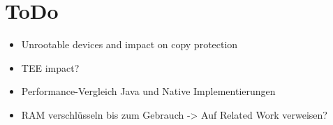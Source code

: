 \chapter{ToDo}

\begin{itemize}
\item Unrootable devices and impact on copy protection
\item TEE impact?
\item Performance-Vergleich Java und Native Implementierungen
\item RAM verschlüsseln bis zum Gebrauch -> Auf Related Work verweisen?
\end{itemize}